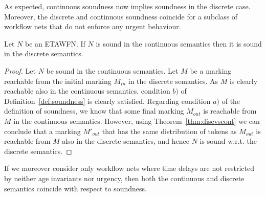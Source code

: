 As expected, continuous soundness now implies soundness in the discrete case.
Moreover, the discrete and continuous soundness coincide for a subclass
of workflow nets that do not enforce any urgent behaviour.

\begin{theorem} \label{thm:implication}
Let $N$ be an ETAWFN. If $N$ is sound in the continuous semantics
then it is sound in the discrete semantics.
\end{theorem}
\begin{proof}
Let $N$ be sound in the continuous semantics. Let $M$ be a marking
reachable from the initial marking $M_\mathit{in}$ in the discrete semantics.
As $M$ is clearly reachable also in the continuous semantics,
condition $b)$ of Definition~\ref{def:soundness} is clearly satisfied.
Regarding condition $a)$ of the definition of soundness, we know
that some final marking $M_\mathit{out}$ is reachable from $M$ in the continuous
semantics. However, using Theorem~\ref{thm:discvscont} we can conclude
that a marking $M'_\mathit{out}$ that has the same distribution of tokens
as $M_\mathit{out}$ is reachable from $M$ also in the discrete semantics,
and hence $N$ is sound w.r.t. the discrete semantics.
\end{proof}

If we moreover consider only workflow nets where time delays are not restricted
by neither age invariants nor urgency, then both the continuous and discrete
semantics coincide with respect to soundness. 

